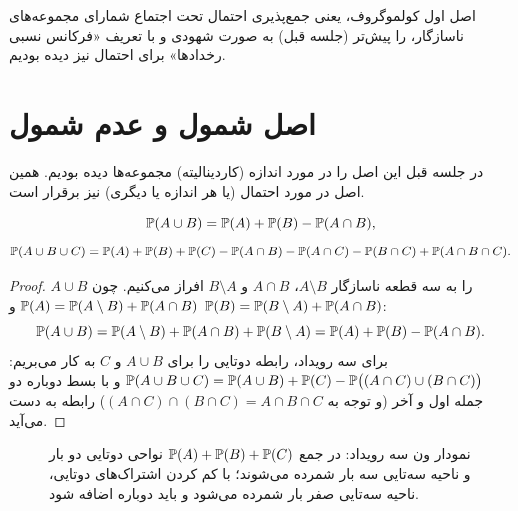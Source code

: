 \begin{note}
\notetitle اصل اول کولموگروف، یعنی جمع‌پذیری احتمال تحت اجتماع شمارای مجموعه‌های ناسازگار، را پیش‌تر (جلسه قبل) به صورت شهودی و با تعریف «فرکانس نسبی رخدادها» برای احتمال نیز دیده بودیم.
\end{note}

\section{اصل شمول و عدم شمول }

در جلسه قبل این اصل را در مورد اندازه (کاردینالیته) مجموعه‌ها دیده بودیم. همین اصل در مورد احتمال (یا هر اندازه یا  دیگری) نیز برقرار است.

\begin{theorem}
\[\mathbb{P}(A\cup B)=\mathbb{P}(A)+\mathbb{P}(B)-\mathbb{P}(A\cap B),\]
\[\mathbb{P}(A\cup B\cup C)=\mathbb{P}(A)+\mathbb{P}(B)+\mathbb{P}(C)-\mathbb{P}(A\cap B)-\mathbb{P}(A\cap C)-\mathbb{P}(B\cap C)+\mathbb{P}(A\cap B\cap C).\]
\end{theorem}
\begin{proof}
$A\cup B$ را به سه قطعه ناسازگار $A\setminus B$، $A\cap B$ و $B\setminus A$ افراز می‌کنیم. چون $\mathbb{P}(A)=\mathbb{P}(A\setminus B)+\mathbb{P}(A\cap B)$ و $\mathbb{P}(B)=\mathbb{P}(B\setminus A)+\mathbb{P}(A\cap B)$:
\[\mathbb{P}(A\cup B)=\mathbb{P}(A\setminus B)+\mathbb{P}(A\cap B)+\mathbb{P}(B\setminus A)=\mathbb{P}(A)+\mathbb{P}(B)-\mathbb{P}(A\cap B).\]
برای سه رویداد، رابطه دوتایی را برای $A\cup B$ و $C$ به کار می‌بریم:
$\mathbb{P}(A\cup B\cup C)=\mathbb{P}(A\cup B)+\mathbb{P}(C)-\mathbb{P}\big((A\cap C)\cup(B\cap C)\big)$
و با بسط دوباره دو جمله اول و آخر (و توجه به $(A\cap C)\cap(B\cap C)=A\cap B\cap C$) رابطه به دست می‌آید.
\end{proof}

\begin{figure}[H]
\centering
{}
\caption{نمودار ون سه رویداد: در جمع $\mathbb{P}(A)+\mathbb{P}(B)+\mathbb{P}(C)$ نواحی دوتایی دو بار و ناحیه سه‌تایی سه بار شمرده می‌شوند؛ با کم کردن اشتراک‌های دوتایی، ناحیه سه‌تایی صفر بار شمرده می‌شود و باید دوباره اضافه شود.}
\end{figure}

